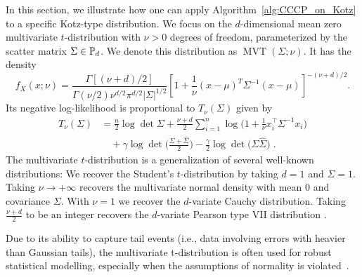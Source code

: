 \documentclass[sn-nature]{sn-jnl}%
\theoremstyle{thmstyleone}%
\theoremstyle{thmstyletwo}%
\theoremstyle{thmstylethree}%
\begin{document}
In this section, we illustrate how one can apply Algorithm~\ref{alg:CCCP_on_Kotz} to a specific Kotz-type distribution. We focus on the $d$-dimensional mean zero multivariate $t$-distribution with $\nu >0$ degrees of freedom, parameterized by the scatter matrix $\Sigma \in \mathbb{P}_d$. We denote this distribution as $\operatorname{MVT}(\Sigma; \nu)$. It has the density 
\[
f_X(x;\nu) = \frac{\Gamma[(\nu+d) / 2]}{\Gamma(\nu / 2) \nu^{d / 2} \pi^{d / 2}|{\Sigma}|^{1 / 2}}\left[1+\frac{1}{\nu}({x}-{\mu})^T {\Sigma}^{-1}({x}-{\mu})\right]^{-(\nu+d) / 2}.
\]
Its negative log-likelihood is proportional to $T_\nu(\Sigma)$ given by \\
\begin{align}
    T_\nu(\Sigma) &= \frac{n}{2}\log \det \Sigma + \frac{\nu + d}{2}\sum_{i=1}^n \log \Big( 1 + \frac{1}{\nu}x_i^\top \Sigma^{-1}x_i\Big) \\
    &\quad + \gamma \log \det \Big(\frac{\Sigma + \hat{\Sigma}}{2}\Big) - \frac{\gamma }{2}\log \det \big(\Sigma \hat{\Sigma}\big) \; . \nonumber
\end{align}
%
The multivariate $t$-distribution is a generalization of several well-known distributions: We recover the Student's $t$-distribution  by taking $d=1$ and $\Sigma = 1$. Taking $\nu \to +\infty$ recovers the multivariate normal density with mean 0 and covariance $\Sigma$. With $\nu = 1$ we recover the $d$-variate Cauchy distribution. Taking $\frac{\nu + d}{2}$ to be an integer recovers the $d$-variate Pearson type VII distribution \cite{Kotz2004}. 

Due to its ability to capture tail events (i.e., data involving errors with heavier than Gaussian tails), the multivariate t-distribution is often used for robust statistical modelling, especially when the assumptions of normality is violated~\cite{Lange1989,Nadarajah2005}. 
\end{document}
